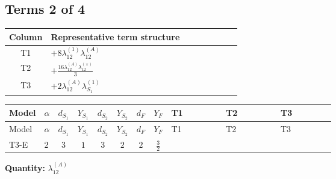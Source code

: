 \documentclass[8pt]{article}
\begin{document}
\begin{landscape}
\subsection*{Terms 2 of 4}
\begin{center}
\begin{tabular}{@{}c >{\raggedright\arraybackslash}p{0.82\linewidth}@{}}
\toprule
Column & Representative term structure \\
\midrule
T1 & \(\displaystyle +8 {\lambda_{12}^{(1)}} {\lambda_{12}^{(A)}}\) \\
\midrule
T2 & \(\displaystyle +\frac{16 {\lambda_{12}^{(A)}} {\lambda_{12}^{(\times)}}}{3}\) \\
\midrule
T3 & \(\displaystyle +2 {\lambda_{12}^{(A)}} {\lambda_{S_1}^{(1)}}\) \\
\midrule
\bottomrule
\end{tabular}
\end{center}
\smallskip
\tiny
\begin{longtable}{@{}llcccccc >{\raggedright\arraybackslash}p{0.21\linewidth} >{\raggedright\arraybackslash}p{0.21\linewidth} >{\raggedright\arraybackslash}p{0.21\linewidth}@{}}
\toprule
Model & $\alpha$ & $d_{S_1}$ & $Y_{S_1}$ & $d_{S_2}$ & $Y_{S_2}$ & $d_F$ & $Y_F$ & T1 & T2 & T3 \\
\midrule
\endfirsthead
\toprule
Model & $\alpha$ & $d_{S_1}$ & $Y_{S_1}$ & $d_{S_2}$ & $Y_{S_2}$ & $d_F$ & $Y_F$ & T1 & T2 & T3 \\
\midrule
\endhead
T3-E & $2$ & $3$ & $1$ & $3$ & $2$ & $2$ & $\frac{3}{2}$ & \scriptsize\adjustbox{max width=\linewidth}{$\begin{gathered} +8 {\lambda_{12}^{(1)}} {\lambda_{12}^{(A)}}\end{gathered}$} & \scriptsize\adjustbox{max width=\linewidth}{$\begin{gathered} +\frac{16 {\lambda_{12}^{(A)}} {\lambda_{12}^{(\times)}}}{3}\end{gathered}$} & \scriptsize\adjustbox{max width=\linewidth}{$\begin{gathered} +2 {\lambda_{12}^{(A)}} {\lambda_{S_1}^{(1)}}\end{gathered}$} \\
\midrule
\bottomrule
\end{longtable}
\clearpage
\noindent\textbf{Quantity: }$\lambda_{12}^{(A)}$\par\smallskip

\end{landscape}
\end{document}
